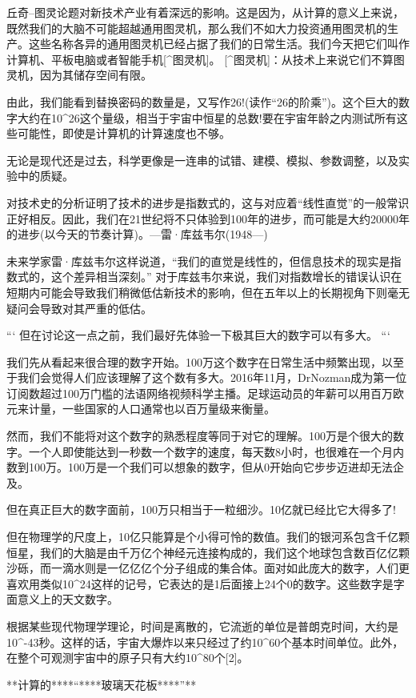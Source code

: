 丘奇–图灵论题对新技术产业有着深远的影响。这是因为，从计算的意义上来说，既然我们的大脑不可能超越通用图灵机，那么我们不如大力投资通用图灵机的生产。这些名称各异的通用图灵机已经占据了我们的日常生活。我们今天把它们叫作计算机、平板电脑或者智能手机[^图灵机]。
[^图灵机]：从技术上来说它们不算图灵机，因为其储存空间有限。

由此，我们能看到替换密码的数量是，又写作26!(读作“26的阶乘”)。这个巨大的数字大约在10^26这个量级，相当于宇宙中恒星的总数!要在宇宙年龄之内测试所有这些可能性，即使是计算机的计算速度也不够。


无论是现代还是过去，科学更像是一连串的试错、建模、模拟、参数调整，以及实验中的质疑。


对技术史的分析证明了技术的进步是指数式的，这与对应着“线性直觉”的一般常识正好相反。因此，我们在21世纪将不只体验到100年的进步，而可能是大约20000年的进步(以今天的节奏计算)。---雷·库兹韦尔(1948—)

未来学家雷·库兹韦尔这样说道，“我们的直觉是线性的，但信息技术的现实是指数式的，这个差异相当深刻。”
对于库兹韦尔来说，我们对指数增长的错误认识在短期内可能会导致我们稍微低估新技术的影响，但在五年以上的长期视角下则毫无疑问会导致对其严重的低估。


```
但在讨论这一点之前，我们最好先体验一下极其巨大的数字可以有多大。
```

我们先从看起来很合理的数字开始。100万这个数字在日常生活中频繁出现，以至于我们会觉得人们应该理解了这个数有多大。2016年11月，DrNozman成为第一位订阅数超过100万门槛的法语网络视频科学主播。足球运动员的年薪可以用百万欧元来计量，一些国家的人口通常也以百万量级来衡量。

然而，我们不能将对这个数字的熟悉程度等同于对它的理解。100万是个很大的数字。一个人即使能达到一秒数一个数字的速度，每天数8小时，也很难在一个月内数到100万。100万是一个我们可以想象的数字，但从0开始向它步步迈进却无法企及。

但在真正巨大的数字面前，100万只相当于一粒细沙。10亿就已经比它大得多了!

但在物理学的尺度上，10亿只能算是个小得可怜的数值。我们的银河系包含千亿颗恒星，我们的大脑是由千万亿个神经元连接构成的，我们这个地球包含数百亿亿颗沙砾，而一滴水则是一亿亿亿个分子组成的集合体。面对如此庞大的数字，人们更喜欢用类似10^24这样的记号，它表达的是1后面接上24个0的数字。这些数字是字面意义上的天文数字。

根据某些现代物理学理论，时间是离散的，它流逝的单位是普朗克时间，大约是10^{-43}秒。这样的话，宇宙大爆炸以来只经过了约10^60个基本时间单位。此外，在整个可观测宇宙中的原子只有大约10^80个[2]。

**计算的****“****玻璃天花板****”**

